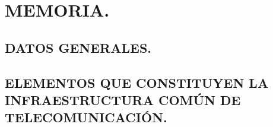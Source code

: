 \chapter{MEMORIA.}

\section{DATOS GENERALES.}





\section{ELEMENTOS QUE CONSTITUYEN LA INFRAESTRUCTURA COMÚN DE TELECOMUNICACIÓN.}











